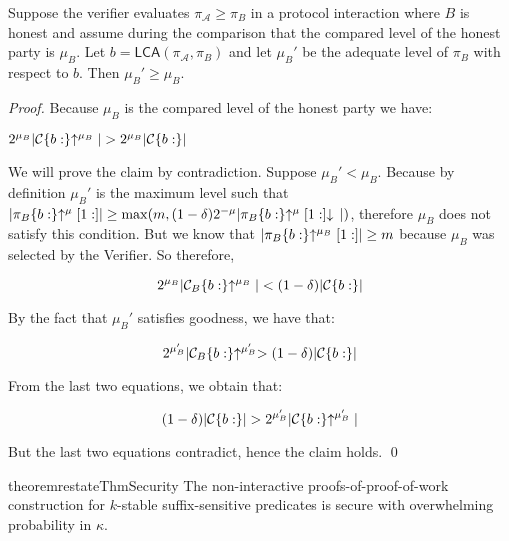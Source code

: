 \begin{lemma}
Suppose the verifier evaluates $\pi_\mathcal{A} \geq \pi_B$ in a protocol
interaction where $B$ is honest and assume during the comparison that the
compared level of the honest party is $\mu_B$. Let $b =
\textsf{LCA}(\pi_\mathcal{A}, \pi_B)$ and let $\mu_B'$ be the adequate
level of $\pi_B$ with respect to $b$. Then $\mu_B' \geq \mu_B$.
\end{lemma}
\begin{proof}
    Because $\mu_B$ is the compared level of the honest party we have:

    $2^{\mu_B}|\mathcal{C}\{b:\}\negthickspace\uparrow^{\mu_B}| > 2^{\mu_B}|\mathcal{C}\{b:\}|$

    We will prove the claim by contradiction. Suppose $\mu_B' < \mu_B$. Because
    by definition $\mu_B'$ is the maximum level such that
    $|\pi_B\{b:\}\negthickspace\uparrow^\mu[1:]| \geq \max(m, (1 -
    \delta)2^{-\mu}|\pi_B\{b:\}\negthickspace\uparrow^\mu[1:]\negthickspace\downarrow\,|)$, therefore
    $\mu_B$ does not satisfy this condition. But we know that
    $|\pi_B\{b:\}\negthickspace\uparrow^{\mu_B}[1:]| \geq m$ because $\mu_B$ was selected by
    the Verifier. So therefore,

    \begin{equation*}
    2^{\mu_B}|\mathcal{C}_B\{b:\}\negthickspace\uparrow^{\mu_B}| < (1 - \delta)|\mathcal{C}\{b:\}|
    \end{equation*}

    By the fact that $\mu_B'$ satisfies goodness, we have that:

    \begin{equation*}
    2^{\mu_B'}|\mathcal{C}_B\{b:\}\negthickspace\uparrow^{\mu_B'} > (1 - \delta)|\mathcal{C}\{b:\}|
    \end{equation*}

    From the last two equations, we obtain that:

    \begin{equation*}
    (1 - \delta)|\mathcal{C}\{b:\}| > 2^{\mu_B'}|\mathcal{C}\{b:\}\negthickspace\uparrow^{\mu_B'}|
    \end{equation*}

    But the last two equations contradict, hence the claim holds.
    \qed
\end{proof}

\begin{restatable}{theorem}{restateThmSecurity}
    \label{thm.security}
    The non-interactive proofs-of-proof-of-work construction for $k$-stable
    suffix-sensitive predicates is secure with overwhelming probability in
    $\kappa$.
\end{restatable}

